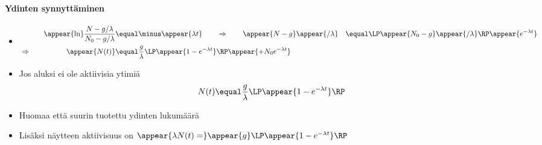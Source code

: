 \begin{frame}
\frametitle{\texorpdfstring{\culine[\sectiontitleulinecolor]{\sectiontitle}}{\sectiontitle} }
\framesubtitle{Ydinten synnyttäminen}%
\appear{}

\begin{itemize}
	\item[] $$
\begin{aligned}
& & \appear{\ln} \frac{N-g / \lambda}{N_{0}-g / \lambda} & \equal  \minus \appear{\lambda t} \qquad \Rightarrow \qquad \appear{N-g} \appear{/ \lambda}& \equal  \LP \appear{N_{0}-g} \appear{/ \lambda} \RP  \appear{e^{-\lambda t}} \\
&\Rightarrow \quad& \appear{N(t)}& \equal \frac{g}{\lambda} \LP \appear{1-e^{-\lambda t}} \RP \appear{+N_{0} e^{-\lambda t}}
\end{aligned}
$$

\item Jos aluksi ei ole aktiivisia ytimiä
\[
N(t)  \equal \frac{g}{\lambda} \LP \appear{1-e^{-\lambda t}} \RP 
\]

\item Huomaa että suurin tuotettu ydinten lukumäärä 

\item Lisäksi näytteen aktiivisuus on $\appear{\lambda N(t)=}\appear{g} \LP \appear{1-e^{-\lambda t}} \RP $  
\end{itemize}

\endofslide 
\end{frame}

